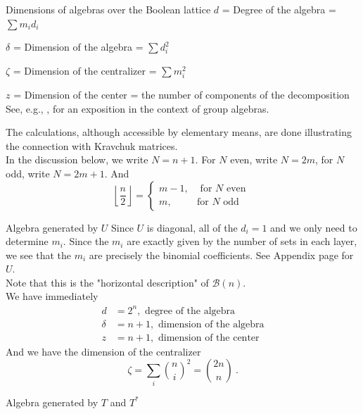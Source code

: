 \documentclass[12pt,reqno]{amsart}
\newenvironment{remark}{{\bf Remark.\ }\rm}{\bigskip}
\begin{document}
\begin{section}{Dimensions of algebras over the Boolean lattice}
$d$ = Degree of the algebra = $\displaystyle \sum m_id_i$\bigskip

$\delta$ = Dimension of the algebra = $\displaystyle \sum d_i^2$ \bigskip

$\zeta$ = Dimension of the centralizer = $\displaystyle \sum m_i^2$ \bigskip

$z$ = Dimension of the center = the number of components of the decomposition \\

\begin{remark}
See, e.g., \cite[Ch.\,1]{Sag}, for an exposition in the context of group algebras.
\end{remark}

The calculations, although accessible by elementary means, are done illustrating the connection with Kravchuk matrices.\\

In the discussion below, we write $N=n+1$. \hfill\break 
For $N$ even, write $N=2m$, for $N$ odd, write $N=2m+1$. And
$$\left\lfloor \frac{n}{2} \right\rfloor =\begin{cases} m-1, &\text{ for $N$ even }\\ m, &\text{for $N$ odd}\end{cases}$$

\begin{subsection}{Algebra generated by $U$}
Since $U$ is diagonal, all of the $d_i=1$ and we only need to determine $m_i$. Since the $m_i$ are exactly given by the number
of sets in each layer, we see that the $m_i$ are precisely the binomial coefficients. See Appendix page for $U$.\\

Note that this is the "horizontal description" of $\mathcal{B}(n)$.\\

We have immediately
\begin{align*}
d&=2^n, \text{ degree of the algebra}\\
\delta&=n+1, \text{ dimension of the algebra}\\
          z&=n+1, \text{ dimension of the center}
\end{align*}
And we have the dimension of the centralizer
$$\zeta=\sum_i \binom{n}{i}^2=\binom{2n}{n}\ .$$
\end{subsection}

\begin{subsection}{Algebra generated by $T$ and $T^*$}
\hfill\\


\end{subsection}
\end{section}
\end{document}
